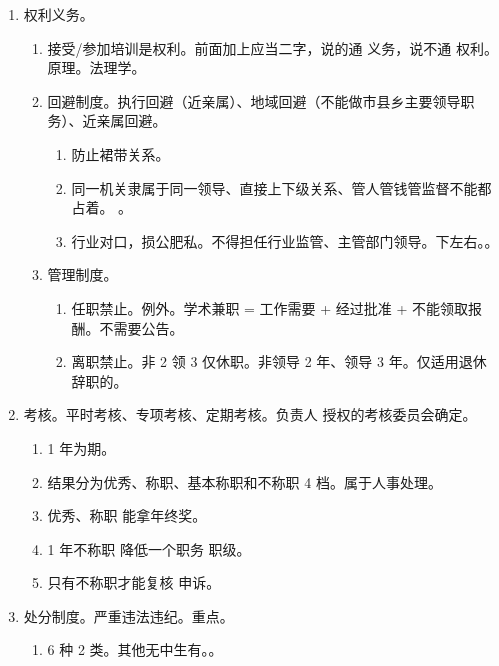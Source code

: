\begin{enumerate}
\begin{enumerate}
\begin{enumerate}
                \end{enumerate}
        \end{enumerate}
  \item 权利义务。
        \begin{enumerate}
          \item 接受/参加培训是权利。前面加上应当二字，说的通 \yjt 义务，说不通 \yjt 权利。原理。法理学。
          \item 回避制度。执行回避（近亲属）、地域回避（不能做市县乡主要领导职务）、近亲属回避。
                \begin{enumerate}
                  \item 防止裙带关系。
                  \item 同一机关隶属于同一领导、直接上下级关系、管人管钱管监督不能都占着。
                        。
                  \item 行业对口，损公肥私。不得担任行业监管、主管部门领导。下左右。。
                \end{enumerate}
          \item 管理制度。
                \begin{enumerate}
                  \item 任职禁止。例外。学术兼职 = 工作需要 + 经过批准 + 不能领取报酬。不需要公告。
                  \item 离职禁止。非 2 领 3 仅休职。非领导 2 年、领导 3 年。仅适用退休 \hz 辞职的。
                \end{enumerate}
        \end{enumerate}
  \item 考核。平时考核、专项考核、定期考核。负责人 \hz 授权的考核委员会确定。
        \begin{enumerate}
          \item 1 年为期。
          \item 结果分为优秀、称职、基本称职和不称职 4 档。属于人事处理。
          \item 优秀、称职 \yjt 能拿年终奖。
          \item 1 年不称职 \yjt 降低一个职务 \hz 职级。
          \item 只有不称职才能复核 \yjt 申诉。
        \end{enumerate}
  \item 处分制度。严重违法违纪。重点。
        \begin{enumerate}
          \item 6 种 2 类。其他无中生有。。

\end{enumerate}
\end{enumerate}
